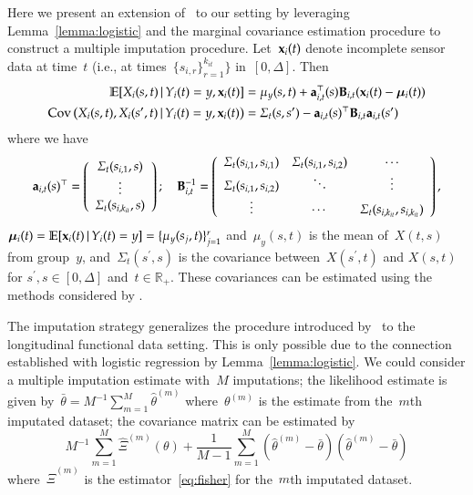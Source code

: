 \documentclass[12pt]{amsart}
\def\E{\mathcal{E}}
\def\E{\mathbb{E}}
\def\given{\, | \,}
\def\bfx{{\bf x}}
\begin{document}
Here we present an extension of~\cite{Petrovich2018} to our setting by leveraging Lemma~\ref{lemma:logistic} and the marginal covariance estimation procedure to construct a multiple imputation procedure. Let~$\bfx_{i} (t)$ denote incomplete sensor data at time~$t$ (i.e., at times~$\{ s_{i,r} \}_{r=1}^{k_{it}} \}$ in~$[0,\Delta]$. Then
\begin{align}
\label{eq:impute}
\E [ X_i (s,t) \given Y_i(t) = y, \bfx_i (t) ]
  &= \mu_y (s,t) + {\bf a}_{i,t}^\top (s) {\bf B}_{i,t} (\bfx_i (t) -
    \mathbold{\mu}_i (t) ) \\
\text{Cov} \left( X_i (s,t), X_i (s^\prime, t) \given Y_i (t) = y,
  \bfx_i (t) \right)
  &= \Sigma_{t} (s, s^\prime) -
    {\bf a}_{i,t} (s)^\top {\bf B}_{i,t} {\bf a}_{i,t} (s^\prime)
\end{align}
where we have
\[
{\bf a}_{i,t} (s)^\top = \left( \begin{array}{c} \Sigma_t (s_{i,1}, s) \\ \vdots \\
                       \Sigma_t (s_{i,k_{it}}, s) \end{array} \right); \quad
{\bf B}_{i,t}^{-1} = \left(
  \begin{array}{c c c}
    \Sigma_t(s_{i,1}, s_{i,1}) & \Sigma_t(s_{i,1}, s_{i,2}) & \cdots \\
    \Sigma_t(s_{i,1}, s_{i,2}) & \ddots & \vdots \\
    \vdots & \cdots & \Sigma_t (s_{i,k_{it}}, s_{i,k_{it}})
  \end{array} \right),
\]
$\mathbold{\mu}_i (t) = \E [ \bfx_i (t) \given Y_i (t) = y] = \{
\mu_y (s_{j}, t) \}_{j=1}^r$ and~$\mu_y (s,t)$ is the mean of~$X(t,s)$
from group~$y$, and~$\Sigma_t ( s^\prime, s)$ is the covariance
between~$X(s^\prime,t)$ and $X(s,t)$ for $s^\prime, s \in [0, \Delta]$
and~$t \in \mathbb{R}_+$.
These covariances can be estimated using the methods considered by
\cite{ChenMuller2012}.

The imputation strategy generalizes the procedure introduced by~\cite{Petrovich2018} to the longitudinal functional data setting.  This is only possible due to the connection established with logistic regression by Lemma~\ref{lemma:logistic}. We could consider a multiple imputation estimate with~$M$ imputations; the likelihood estimate is given by~$\bar \theta = M^{-1} \sum_{m=1}^M \hat \theta^{(m)}$ where~$\theta^{(m)}$ is the estimate from the~$m$th imputated dataset; the covariance matrix can be estimated by
\[
M^{-1} \sum_{m=1}^M \hat \Xi^{(m)} (\theta) + \frac{1}{M-1}
\sum_{m=1}^M (\hat \theta^{(m)} - \bar \theta) (\hat \theta^{(m)} -
\bar \theta)
\]
where~$\hat \Xi^{(m)}$ is the estimator~\eqref{eq:fisher} for
the~$m$th imputated dataset.
\end{document}
